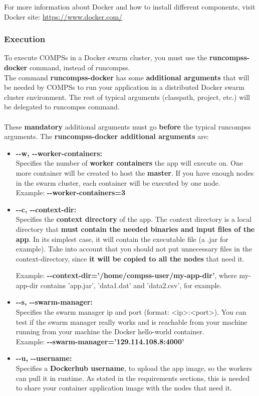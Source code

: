 For more information about Docker and how to install different components, visit Docker site: \url{https://www.docker.com/}

\clearpage
\subsubsection{Execution}
To execute COMPSs in a Docker swarm cluster, you must use the \textbf{runcompss-docker} command, instead of runcompss.
\\
The command \textbf{runcompss-docker} has some \textbf{additional arguments} that will be needed by COMPSs to run your application 
in a distributed Docker swarm cluster environment.
The rest of typical arguments (classpath, project, etc.) will be delegated to runcompss command.
\\ \\
These \textbf{mandatory} additional arguments must go \textbf{before} the typical runcompss arguments. 
The \textbf{runcompss-docker additional arguments} are:
\begin{itemize}
 \item { 
 \textbf{-{}-w, -{}-worker-containers:} \\  
 Specifies the number of \textbf{worker containers} the app will execute on. One more container will be created to host the \textbf{master}. 
 If you have enough nodes in the swarm cluster, each container will be executed by one node.\\
 Example:  \textbf{-{}-worker-containers=3}
 }
 
 \item { 
 \textbf{-{}-c, -{}-context-dir:} \\
 Specifies the \textbf{context directory} of the app. 
 The context directory is a local directory that \textbf{must contain the needed binaries and input files of the app}.
 In its simplest case, it will contain the executable file (a .jar for example).
 Take into account that you should not put unnecessary files in the context-directory, 
 since \textbf{it will be copied to all the nodes} that need it.
 
 Example: \textbf{-{}-context-dir='/home/compss-user/my-app-dir'}, where my-app-dir contains 'app.jar', 'data1.dat' and 'data2.csv', for example.
 }

 \item { 
 \textbf{-{}-s, -{}-swarm-manager:} \\
 Specifies the swarm manager ip and port (format: <ip>:<port>). 
 You can test if the swarm manager really works and is reachable from your machine
 running from your machine the Docker hello-world container.\\
 Example: \textbf{-{}-swarm-manager='129.114.108.8:4000'}
 }
 
 \item { 
 \textbf{-{}-u, -{}-username:} \\
 Specifies a \textbf{Dockerhub username}, to upload the app image, so the workers can pull it in runtime. 
 As stated in the requirements sections, this is needed to share your container application image with the nodes that need it.
 }
\end{itemize}

